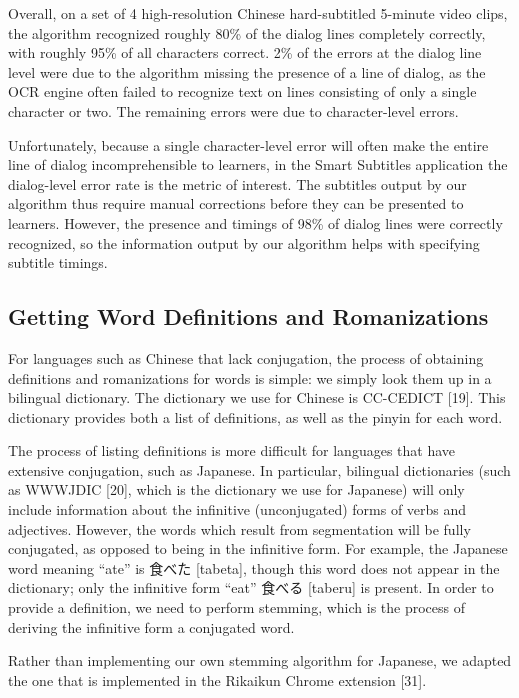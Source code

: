 \documentclass{sigchi}
\begin{document}
Overall, on a set of 4 high-resolution Chinese hard-subtitled 5-minute video clips, the algorithm recognized roughly 80\% of the dialog lines completely correctly, with roughly 95\% of all characters correct. 2\% of the errors at the dialog line level were due to the algorithm missing the presence of a line of dialog, as the OCR engine often failed to recognize text on lines consisting of only a single character or two. The remaining errors were due to character-level errors.

Unfortunately, because a single character-level error will often make the entire line of dialog incomprehensible to learners, in the Smart Subtitles application the dialog-level error rate is the metric of interest. The subtitles output by our algorithm thus require manual corrections before they can be presented to learners. However, the presence and timings of 98\% of dialog lines were correctly recognized, so the information output by our algorithm helps with specifying subtitle timings.

\subsection{Getting Word Definitions and Romanizations}

For languages such as Chinese that lack conjugation, the process of obtaining definitions and romanizations for words is simple: we simply look them up in a bilingual dictionary. The dictionary we use for Chinese is CC-CEDICT [19]. This dictionary provides both a list of definitions, as well as the pinyin for each word.

The process of listing definitions is more difficult for languages that have extensive conjugation, such as Japanese. In particular, bilingual dictionaries (such as WWWJDIC [20], which is the dictionary we use for Japanese) will only include information about the infinitive (unconjugated) forms of verbs and adjectives. However, the words which result from segmentation will be fully conjugated, as opposed to being in the infinitive form. For example, the Japanese word meaning “ate” is 食べた [tabeta], though this word does not appear in the dictionary; only the infinitive form “eat” 食べる [taberu] is present. In order to provide a definition, we need to perform stemming, which is the process of deriving the infinitive form a conjugated word.

Rather than implementing our own stemming algorithm for Japanese, we adapted the one that is implemented in the Rikaikun Chrome extension [31].
\end{document}
